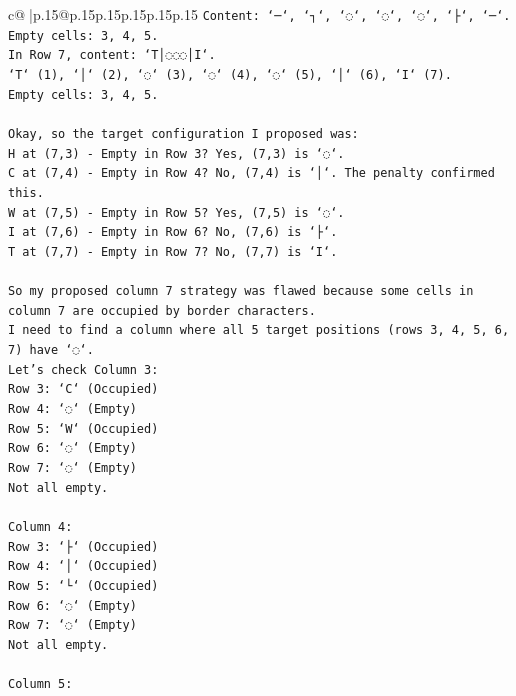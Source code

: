 \documentclass{article}
\begin{document}
{\begin{supertabular}{c@{$\;$}|p{.15\linewidth}@{}p{.15\linewidth}p{.15\linewidth}p{.15\linewidth}p{.15\linewidth}p{.15\linewidth}}
{{{\texttt{Content: `─`, `┐`, `◌`, `◌`, `◌`, `├`, `─`.} \\
\texttt{Empty cells: 3, 4, 5.} \\
\texttt{In Row 7, content: `T│◌◌◌│I`.} \\
\texttt{`T` (1), `│` (2), `◌` (3), `◌` (4), `◌` (5), `│` (6), `I` (7).} \\
\texttt{Empty cells: 3, 4, 5.} \\
\\ 
\texttt{Okay, so the target configuration I proposed was:} \\
\texttt{H at (7,3) {-} Empty in Row 3? Yes, (7,3) is `◌`.} \\
\texttt{C at (7,4) {-} Empty in Row 4? No, (7,4) is `│`. The penalty confirmed this.} \\
\texttt{W at (7,5) {-} Empty in Row 5? Yes, (7,5) is `◌`.} \\
\texttt{I at (7,6) {-} Empty in Row 6? No, (7,6) is `├`.} \\
\texttt{T at (7,7) {-} Empty in Row 7? No, (7,7) is `I`.} \\
\\ 
\texttt{So my proposed column 7 strategy was flawed because some cells in column 7 are occupied by border characters.} \\
\texttt{I need to find a column where all 5 target positions (rows 3, 4, 5, 6, 7) have `◌`.} \\
\texttt{Let's check Column 3:} \\
\texttt{Row 3: `C` (Occupied)} \\
\texttt{Row 4: `◌` (Empty)} \\
\texttt{Row 5: `W` (Occupied)} \\
\texttt{Row 6: `◌` (Empty)} \\
\texttt{Row 7: `◌` (Empty)} \\
\texttt{Not all empty.} \\
\\ 
\texttt{Column 4:} \\
\texttt{Row 3: `├` (Occupied)} \\
\texttt{Row 4: `│` (Occupied)} \\
\texttt{Row 5: `└` (Occupied)} \\
\texttt{Row 6: `◌` (Empty)} \\
\texttt{Row 7: `◌` (Empty)} \\
\texttt{Not all empty.} \\
\\ 
\texttt{Column 5:} \\
}}}
\end{supertabular}}
\end{document}
